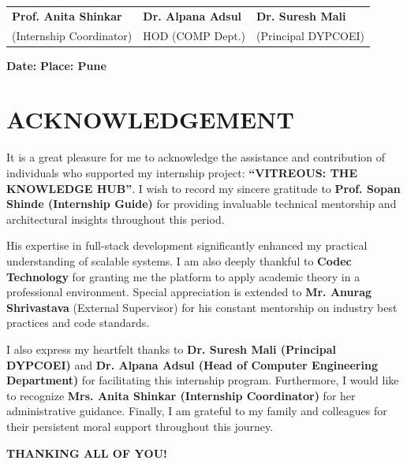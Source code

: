 \documentclass[12pt,a4paper]{report}
\begin{document}
\vspace{1.5cm}

\begin{tabular}{p{5cm} p{5cm} p{5cm}}
\textbf{Prof. Anita Shinkar} & \textbf{Dr. Alpana Adsul} & \textbf{Dr. Suresh Mali} \\
(Internship Coordinator) & HOD (COMP Dept.) & (Principal DYPCOEI)
\end{tabular}

\vspace{1.5cm}

\noindent
\textbf{Date:} \hspace{10cm} \textbf{Place: Pune}

\newpage

\chapter*{ACKNOWLEDGEMENT}

It is a great pleasure for me to acknowledge the assistance and contribution of individuals who supported my internship project: \textbf{``VITREOUS: THE KNOWLEDGE HUB''}. I wish to record my sincere gratitude to \textbf{Prof. Sopan Shinde (Internship Guide)} for providing invaluable technical mentorship and architectural insights throughout this period.

His expertise in full-stack development significantly enhanced my practical understanding of scalable systems. I am also deeply thankful to \textbf{Codec Technology} for granting me the platform to apply academic theory in a professional environment. Special appreciation is extended to \textbf{Mr. Anurag Shrivastava} (External Supervisor) for his constant mentorship on industry best practices and code standards.

I also express my heartfelt thanks to \textbf{Dr. Suresh Mali (Principal DYPCOEI)} and \textbf{Dr. Alpana Adsul (Head of Computer Engineering Department)} for facilitating this internship program. Furthermore, I would like to recognize \textbf{Mrs. Anita Shinkar (Internship Coordinator)} for her administrative guidance. Finally, I am grateful to my family and colleagues for their persistent moral support throughout this journey.

\vspace{1cm}
\begin{center}
{\bfseries THANKING ALL OF YOU!}
\end{center}
\end{document}
